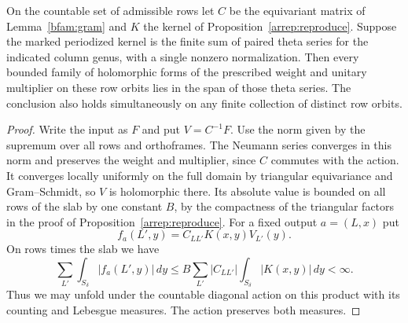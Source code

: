 \begin{proposition}\label{munf:span}
On the countable set of admissible rows let \(C\) be the equivariant
matrix of Lemma~\ref{bfam:gram} and \(K\) the kernel of
Proposition~\ref{arrep:reproduce}. Suppose the marked periodized
kernel is the finite sum of paired theta series for the indicated
column genus, with a single nonzero normalization. Then every
bounded family of holomorphic forms of the prescribed weight and
unitary multiplier on these row orbits lies in the span of those
theta series. The conclusion also holds simultaneously on any finite
collection of distinct row orbits.
\end{proposition}
\begin{proof}
Write the input as \(F\) and put \(V=C^{-1}F\). Use the norm given
by the supremum over all rows and orthoframes. The Neumann series
converges in this norm and preserves the weight and multiplier,
since \(C\) commutes with the action. It converges locally uniformly
on the full domain by triangular equivariance and Gram--Schmidt,
so \(V\) is holomorphic there. Its absolute value is bounded on all
rows of the slab by one constant \(B\), by the compactness of the
triangular factors in the proof of Proposition~\ref{arrep:reproduce}.
For a fixed output \(a=(L,x)\) put
\[
          f_a(L',y)=C_{LL'}K(x,y)V_{L'}(y).
\]
On rows times the slab we have
\[
 \sum_{L'}\int_{S_\delta}|f_a(L',y)|\,dy
       \le B\sum_{L'}|C_{LL'}|\int_{S_\delta}|K(x,y)|\,dy<\infty .
\]
Thus we may unfold under the countable diagonal action on this
product with its counting and Lebesgue measures. The action
preserves both measures.


\end{proof}

